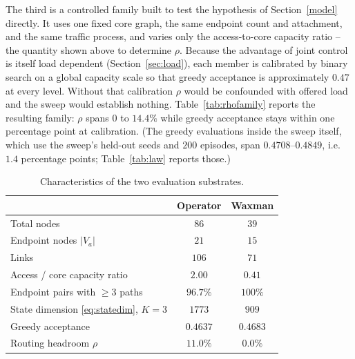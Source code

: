 \documentclass[10pt,journal,comsoc]{IEEEtran}
\begin{document}
The third is a controlled family built to test the hypothesis of
Section~\ref{model} directly. It uses one fixed core graph, the same
endpoint count and attachment, and the same traffic process, and varies
only the access-to-core capacity ratio -- the quantity shown above to
determine $\rho$. Because the advantage of joint control is itself load
dependent (Section~\ref{sec:load}), each member is calibrated by binary
search on a global capacity scale so that greedy acceptance is
approximately $0.47$ at every level. Without that calibration $\rho$ would
be confounded with offered load and the sweep would establish nothing.
Table~\ref{tab:rhofamily} reports the resulting family: $\rho$ spans
$0$ to $14.4\%$ while greedy acceptance stays within one percentage point
at calibration. (The greedy evaluations inside the sweep itself, which use
the sweep's held-out seeds and $200$ episodes, span $0.4708$--$0.4849$,
i.e.\ $1.4$ percentage points; Table~\ref{tab:law} reports those.)

\begin{table}[t]
\centering
\caption{Characteristics of the two evaluation substrates.}
\label{tab:topologies}
\renewcommand{\arraystretch}{1.15}
\begin{tabular}{lcc}
\toprule
& \textbf{Operator} & \textbf{Waxman} \\
\midrule
Total nodes                        & $86$    & $39$ \\
Endpoint nodes $|V_a|$             & $21$    & $15$ \\
Links                              & $106$   & $71$ \\
Access / core capacity ratio       & $2.00$  & $0.41$ \\
Endpoint pairs with $\geq 3$ paths & $96.7\%$ & $100\%$ \\
State dimension \eqref{eq:statedim}, $K{=}3$ & $1773$ & $909$ \\
Greedy acceptance                  & $0.4637$ & $0.4683$ \\
Routing headroom $\rho$            & $\mathbf{11.0\%}$ & $\mathbf{0.0\%}$ \\
\bottomrule
\end{tabular}
\end{table}
\end{document}
